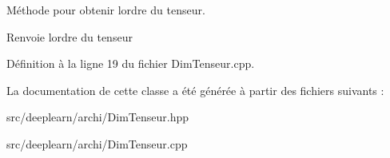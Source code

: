 Méthode pour obtenir l\textquotesingle{}ordre du tenseur. 

\begin{DoxyReturn}{Renvoie}
l\textquotesingle{}ordre du tenseur 
\end{DoxyReturn}


Définition à la ligne 19 du fichier Dim\+Tenseur.\+cpp.



La documentation de cette classe a été générée à partir des fichiers suivants \+:\begin{DoxyCompactItemize}
\item 
src/deeplearn/archi/Dim\+Tenseur.\+hpp\item 
src/deeplearn/archi/Dim\+Tenseur.\+cpp\end{DoxyCompactItemize}
